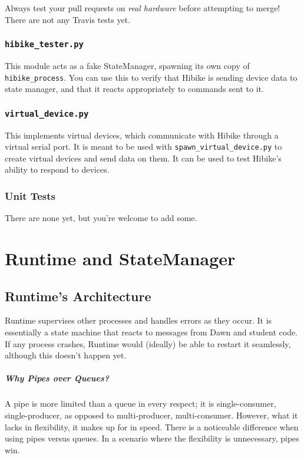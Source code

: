 \documentclass[12pt]{book}
\begin{document}
Always test your pull requests on \textit{real hardware} before
attempting to merge! There are not any Travis tests yet.
\subsection{\texttt{hibike\_tester.py}}
This module acts as a fake StateManager, spawning its own
copy of \texttt{hibike\_process}. You can use this to verify
that Hibike is sending device data to state manager, and that
it reacts appropriately to commands sent to it.
\subsection{\texttt{virtual\_device.py}}
This implements virtual devices, which communicate with Hibike
through a virtual serial port. It is meant to be used with
\texttt{spawn\_virtual\_device.py} to create virtual devices
and send data on them. It can be used to test Hibike's ability to
respond to devices.
\subsection{Unit Tests}
There are none yet, but you're welcome to add some.


\chapter{Runtime and StateManager}
\section{Runtime's Architecture}
Runtime supervises other processes and handles errors as they occur. It is
essentially a state machine that reacts to messages from Dawn and student
code. If any process crashes, Runtime would (ideally) be able to restart
it seamlessly, although this doesn't happen yet.

\paragraph{Why Pipes over Queues?}

A pipe is more limited than a queue in every respect; it is single-consumer,
single-producer, as opposed to multi-producer, multi-consumer.
However, what it lacks in flexibility, it makes up for in speed.
There is a noticeable difference when using pipes versus queues.
In a scenario where the flexibility is unnecessary, pipes win.
\end{document}

